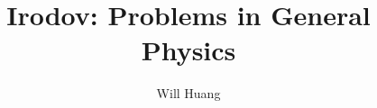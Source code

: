\documentclass[12pt]{article}
\begin{document}
\title{Irodov: Problems in General Physics}
\author{Will Huang}
\maketitle
\tableofcontents


\end{document}
